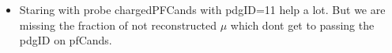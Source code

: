 \documentclass{beamer}
\begin{document}
\begin{frame}
\begin{columns}
\begin{column}{0.33\textwidth}
   \end{column}
  \end{columns}
\begin{itemize}
 \item Staring with probe chargedPFCands with pdgID=11 help a lot. But we are missing the fraction of not reconstructed $\mu$ which dont get to passing the pdgID on pfCands.
\end{itemize}
\end{frame}
\end{document}
